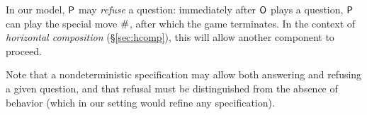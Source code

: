In our model,
$ \mathsf{P} $ may \emph{refuse} a question:
immediately after $ \mathsf{O} $ plays a question,
$ \mathsf{P} $ can play the special move $ \mathsf{\#} $,
after which the game terminates.
In the context of
\emph{horizontal composition} (\S\ref{sec:hcomp}),
this will allow another component to proceed.

Note that a nondeterministic specification
may allow both answering and refusing a given question,
and that refusal must be distinguished from
the absence of behavior
(which in our setting would refine any specification).

%
%

